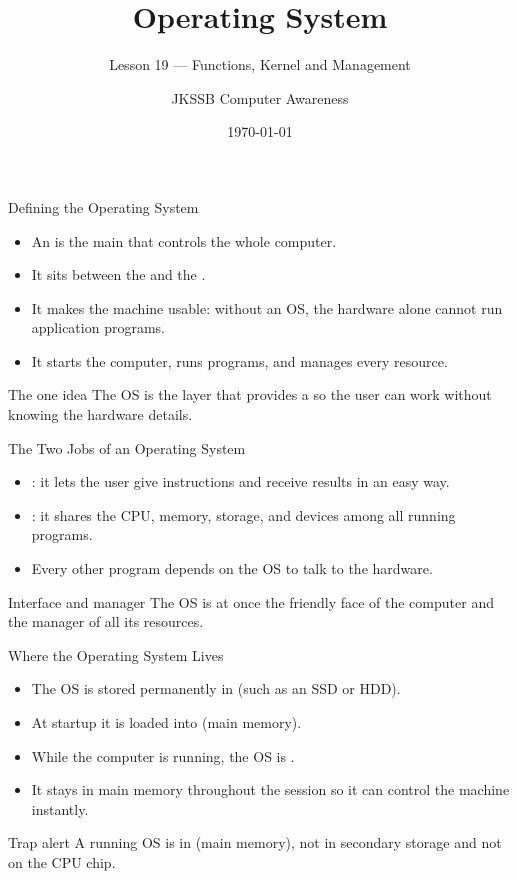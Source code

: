 \documentclass[aspectratio=169]{beamer}
\title{Operating System}
\subtitle{Lesson 19 --- Functions, Kernel and Management}
\author{JKSSB Computer Awareness}
\date{\today}
\begin{document}
\frame{\titlepage}

\begin{frame}{Defining the Operating System}
  \begin{itemize}
    \item An  is the main  that
      controls the whole computer.
    \item It sits between the  and the .
    \item It makes the machine usable: without an OS, the hardware alone cannot
      run application programs.
    \item It starts the computer, runs programs, and manages every resource.
  \end{itemize}
  \begin{block}{The one idea}
    The OS is the layer that provides a  so the
    user can work without knowing the hardware details.
  \end{block}
\end{frame}

\begin{frame}{The Two Jobs of an Operating System}
  \begin{itemize}
    \item {}: it lets the user give instructions and receive
      results in an easy way.
    \item {}: it shares the CPU, memory, storage, and
      devices among all running programs.
    \item Every other program depends on the OS to talk to the hardware.
  \end{itemize}
  \begin{block}{Interface and manager}
    The OS is at once the friendly face of the computer and the manager of all
    its resources.
  \end{block}
\end{frame}

\begin{frame}{Where the Operating System Lives}
  \begin{itemize}
    \item The OS is stored permanently in  (such as an
      SSD or HDD).
    \item At startup it is loaded into  (main memory).
    \item While the computer is running, the OS is .
    \item It stays in main memory throughout the session so it can control the
      machine instantly.
  \end{itemize}
  \begin{alertblock}{Trap alert}
    A running OS is in  (main memory), not in secondary
    storage and not on the CPU chip.
  \end{alertblock}
\end{frame}
\end{document}
